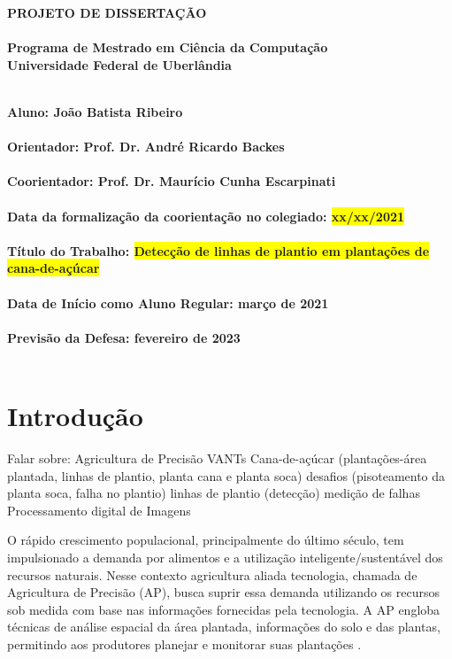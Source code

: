 \documentclass[12pt, a4paper, english, brazil]{article}
\newcommand{\textBlue}[1]{{{\color{blue} #1}}}
\begin{document}
\rhead{\thepage}

\begin{center}
	\bf{\LARGE{PROJETO DE DISSERTAÇÃO}\\ $\ $\\}
	\Large{Programa de Mestrado em Ciência da Computação\\
		Universidade Federal de Uberlândia}\\ $\ $\\
\end{center}

\begin{center}
	\bf{Aluno: João Batista Ribeiro\\ $\ $\\
		Orientador: Prof. Dr. André Ricardo Backes\\ $\ $\\
		Coorientador: Prof. Dr. Maurício Cunha Escarpinati\\ $\ $\\
		Data da formalização da coorientação no colegiado: \colorbox{yellow}{xx/xx/2021}\\ $\ $\\
		Título do Trabalho: \colorbox{yellow}{Detecção de linhas de plantio em plantações de cana-de-açúcar}\\ $\ $\\
		Data de Início como Aluno Regular: março de 2021\\ $\ $\\
		Previsão da Defesa: fevereiro de 2023\\ $\ $\\}
\end{center}

\section{Introdução}
\textBlue{
Falar sobre:
Agricultura de Precisão
    VANTs
Cana-de-açúcar (plantações-área plantada, linhas de plantio, planta cana e planta soca)
desafios (pisoteamento da planta soca, falha no plantio)
linhas de plantio (detecção) 
medição de falhas
Processamento digital de Imagens
}


O rápido crescimento populacional, principalmente do último século, tem impulsionado a demanda por alimentos e a utilização inteligente/sustentável dos recursos naturais. Nesse contexto agricultura aliada tecnologia, chamada de Agricultura de Precisão (AP), busca suprir essa demanda utilizando os recursos sob medida com base nas informações fornecidas pela tecnologia. A AP engloba técnicas de análise espacial da área plantada, informações do solo e das plantas, permitindo aos produtores planejar e monitorar suas plantações \cite{Blasch_2020}.
\end{document}
